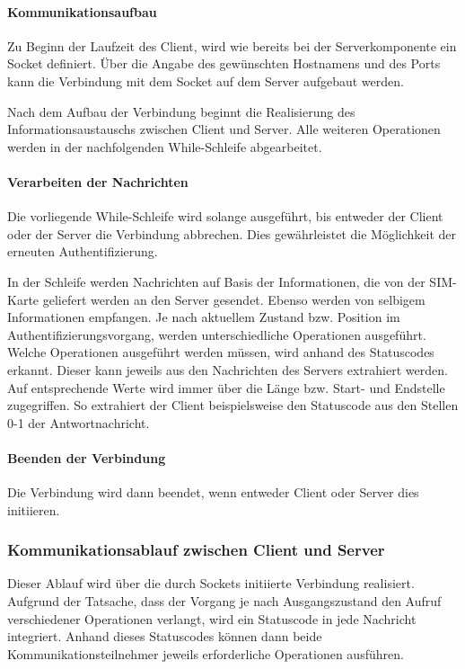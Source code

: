         \paragraph{Kommunikationsaufbau} Zu Beginn der Laufzeit des Client, wird wie bereits bei der 
        Serverkomponente ein Socket definiert. Über die Angabe des gewünschten Hostnamens und des Ports
        kann die Verbindung mit dem Socket auf dem Server aufgebaut werden.

        Nach dem Aufbau der Verbindung beginnt die Realisierung des Informationsaustauschs zwischen
        Client und Server.
        Alle weiteren Operationen werden in der nachfolgenden While-Schleife abgearbeitet.

        \paragraph{Verarbeiten der Nachrichten} Die vorliegende While-Schleife wird solange ausgeführt,
        bis entweder der Client oder der Server die Verbindung abbrechen. Dies gewährleistet die
        Möglichkeit der erneuten Authentifizierung.

        In der Schleife werden Nachrichten auf Basis der Informationen, die von der SIM-Karte geliefert werden
        an den Server gesendet. Ebenso werden von selbigem Informationen empfangen. Je nach aktuellem Zustand
        bzw. Position im Authentifizierungsvorgang, werden unterschiedliche Operationen ausgeführt.
        Welche Operationen ausgeführt werden müssen, wird anhand des Statuscodes erkannt. Dieser kann
        jeweils aus den Nachrichten des Servers extrahiert werden. Auf entsprechende Werte wird immer
        über die Länge bzw. Start- und Endstelle zugegriffen. So extrahiert der Client beispielsweise
        den Statuscode aus den Stellen 0-1 der Antwortnachricht.

        \paragraph{Beenden der Verbindung} Die Verbindung wird dann beendet, wenn entweder Client
        oder Server dies initiieren. 
	
    \subsubsection{Kommunikationsablauf zwischen Client und Server}
    Dieser Ablauf wird über die durch Sockets initiierte Verbindung realisiert. Aufgrund
    der Tatsache, dass der Vorgang je nach Ausgangszustand den Aufruf verschiedener Operationen
    verlangt, wird ein Statuscode in jede Nachricht integriert. Anhand dieses Statuscodes
    können dann beide Kommunikationsteilnehmer jeweils erforderliche Operationen ausführen.

